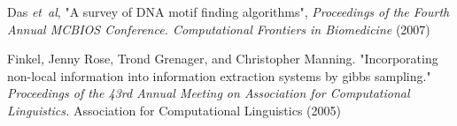 \documentclass{bioinfo}
\begin{document}
\begin{thebibliography}{}
    Das \textit{et~al}, "A survey of DNA motif finding algorithms", \textit{Proceedings of the Fourth Annual MCBIOS Conference. Computational Frontiers in Biomedicine} (2007)

    Finkel, Jenny Rose, Trond Grenager, and Christopher Manning. "Incorporating non-local information into information extraction systems by gibbs sampling." \textit{Proceedings of the 43rd Annual Meeting on Association for Computational Linguistics.} Association for Computational Linguistics (2005)
\end{thebibliography}
\end{document}
